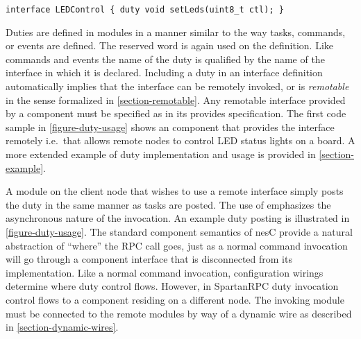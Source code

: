 \begin{lrbox}{\savebigbox}
\begin{minipage}{4.2in}
\vspace{0.8em}
\begin{Verbatim}
interface LEDControl { duty void setLeds(uint8_t ctl); }
\end{Verbatim}
\vspace{0.3em}
\end{minipage}
\end{lrbox}
\centerline{\usebox{\savebigbox}}

Duties are defined in modules in a manner similar to the way tasks, commands, or events are
defined. The reserved word  is again used on the definition. Like commands and events
the name of the duty is qualified by the name of the interface in which it is declared.
Including a duty in an interface definition automatically implies that the interface can be
remotely invoked, or is \emph{remotable} in the sense formalized in \autoref{section-remotable}.
Any remotable interface provided by a component must be specified as  in its
provides specification. The first code sample in \autoref{figure-duty-usage} shows an
 component that provides the  interface remotely i.e.~that
allows remote nodes to control LED status lights on a board. A more extended example of duty
implementation and usage is provided in \autoref{section-example}.

A module on the client node that wishes to use a remote interface simply posts the duty in the
same manner as tasks are posted. The use of  emphasizes the asynchronous nature of
the invocation. An example duty posting is illustrated in \autoref{figure-duty-usage}. The
standard component semantics of nesC provide a natural abstraction of ``where'' the RPC call
goes, just as a normal command invocation will go through a component interface that is
disconnected from its implementation. Like a normal command invocation, configuration wirings
determine where duty control flows. However, in SpartanRPC duty invocation control flows to a
component residing on a different node. The invoking module must be connected to the remote
modules by way of a dynamic wire as described in \autoref{section-dynamic-wires}.

